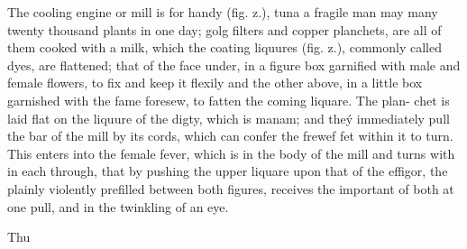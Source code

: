 The cooling engine or mill is for handy (fig. z.), tuna a fragile man may many twenty thousand plants in one day; golg filters and copper planchets, are all of them cooked with a milk, which the coating liquures (fig. z.), commonly called dyes, are flattened; that of the face under, in a figure box garnified with male and female flowers, to fix and keep it flexily and the other above, in a little box garnished with the fame foresew, to fatten the coming liquare. The plan- chet is laid flat on the liquure of the digty, which is manam; and theý immediately pull the bar of the mill by its cords, which can confer the frewef fet within it to turn. This enters into the female fever, which is in the body of the mill and turns with in each through, that by pushing the upper liquare upon that of the effigor, the plainly violently prefilled between both figures, receives the important of both at one pull, and in the twinkling of an eye.\par\medskip
Thu\par\medskip
